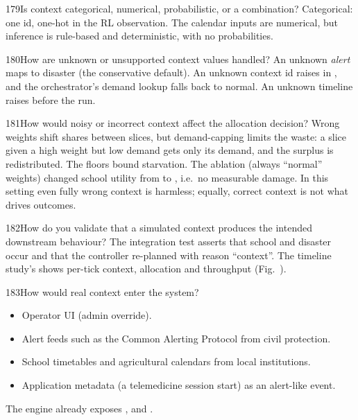 \begin{qa}{179}{Is context categorical, numerical, probabilistic, or a combination?}
Categorical: one id, one-hot in the RL observation. The calendar inputs are numerical, but inference is rule-based and
deterministic, with no probabilities.
\end{qa}

\begin{qa}{180}{How are unknown or unsupported context values handled?}
An unknown \emph{alert} maps to disaster (the conservative default). An unknown context id raises in
, and the orchestrator's demand lookup falls back to normal. An unknown timeline raises before the
run.
\end{qa}

\begin{qa}{181}{How would noisy or incorrect context affect the allocation decision?}
Wrong weights shift shares between slices, but demand-capping limits the waste: a slice given a high weight but low
demand gets only its demand, and the surplus is redistributed. The floors bound starvation. The 
ablation (always ``normal'' weights) changed school utility from \NAblSchoolFullUtil{} to \NAblSchoolNoContextUtil{}, i.e.\ no
measurable damage. In this setting even fully wrong context is harmless; equally, correct context is not what drives
outcomes.
\end{qa}

\begin{qa}{182}{How do you validate that a simulated context produces the intended downstream behaviour?}
The integration test  asserts that school and disaster occur and that
the controller re-planned with reason ``context''. The timeline study's  shows per-tick context,
allocation and throughput (Fig.~).
\end{qa}

\begin{qa}{183}{How would real context enter the system?}
\begin{itemize}
\item Operator UI (admin override).
\item Alert feeds such as the Common Alerting Protocol from civil protection.
\item School timetables and agricultural calendars from local institutions.
\item Application metadata (a telemedicine session start) as an alert-like event.
\end{itemize}
The engine already exposes ,  and .
\end{qa}

